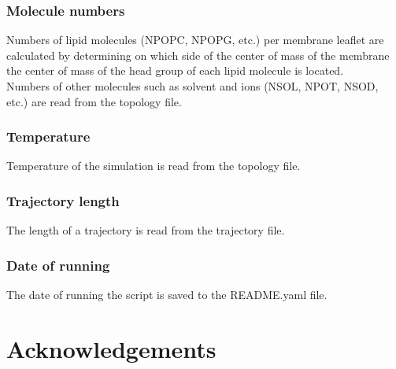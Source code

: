 \documentclass[fleqn,10pt]{wlscirep}
\begin{document}
\subsubsection*{Molecule numbers}
Numbers of lipid molecules (NPOPC, NPOPG, etc.) per membrane leaflet are calculated by determining on which side of the center of mass of the membrane the center of mass of the head group of each lipid molecule is located.
\newline \\
\noindent Numbers of other molecules such as solvent and ions (NSOL, NPOT, NSOD, etc.) are read from the topology file.

\subsubsection*{Temperature}
Temperature of the simulation is read from the topology file.

\subsubsection*{Trajectory length}
The length of a trajectory is read from the trajectory file.

\subsubsection*{Date of running}
The date of running the script is saved to the README.yaml file.







\section*{Acknowledgements}

\end{document}
